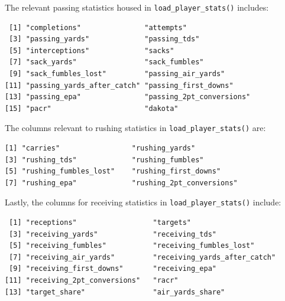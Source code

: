 \documentclass[
  letterpaper,
]{krantz}
\begin{document}
\begin{tcolorbox}[enhanced jigsaw, left=2mm, toprule=.15mm, opacitybacktitle=0.6, leftrule=.75mm, bottomrule=.15mm, colbacktitle=quarto-callout-tip-color!10!white, breakable, colback=white, bottomtitle=1mm, toptitle=1mm, title=\textcolor{quarto-callout-tip-color}{\faLightbulb}\hspace{0.5em}{Tip}, coltitle=black, titlerule=0mm, arc=.35mm, opacityback=0, colframe=quarto-callout-tip-color-frame, rightrule=.15mm]

The relevant passing statistics housed in \texttt{load\_player\_stats()}
includes:

\begin{verbatim}
 [1] "completions"               "attempts"                 
 [3] "passing_yards"             "passing_tds"              
 [5] "interceptions"             "sacks"                    
 [7] "sack_yards"                "sack_fumbles"             
 [9] "sack_fumbles_lost"         "passing_air_yards"        
[11] "passing_yards_after_catch" "passing_first_downs"      
[13] "passing_epa"               "passing_2pt_conversions"  
[15] "pacr"                      "dakota"                   
\end{verbatim}

The columns relevant to rushing statistics in
\texttt{load\_player\_stats()} are:

\begin{verbatim}
[1] "carries"                 "rushing_yards"          
[3] "rushing_tds"             "rushing_fumbles"        
[5] "rushing_fumbles_lost"    "rushing_first_downs"    
[7] "rushing_epa"             "rushing_2pt_conversions"
\end{verbatim}

Lastly, the columns for receiving statistics in
\texttt{load\_player\_stats()} include:

\begin{verbatim}
 [1] "receptions"                  "targets"                    
 [3] "receiving_yards"             "receiving_tds"              
 [5] "receiving_fumbles"           "receiving_fumbles_lost"     
 [7] "receiving_air_yards"         "receiving_yards_after_catch"
 [9] "receiving_first_downs"       "receiving_epa"              
[11] "receiving_2pt_conversions"   "racr"                       
[13] "target_share"                "air_yards_share"            
\end{verbatim}

\end{tcolorbox}
\end{document}
